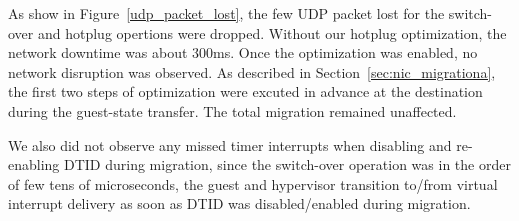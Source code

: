 As show in Figure~\ref{udp_packet_lost}, the few UDP packet
lost for the switch-over and hotplug opertions were dropped.
Without our hotplug optimization, the network downtime was
about 300ms. Once the optimization was enabled, no network
disruption was observed. As described in
Section~\ref{sec:nic_migrationa}, the first two steps of
optimization were excuted in advance at the destination during
the guest-state transfer. The total migration remained
unaffected.

We also did not observe any missed timer interrupts when
disabling and re-enabling DTID during migration, since the
switch-over operation was in the order of few tens of
microseconds, the guest and hypervisor transition to/from
virtual interrupt delivery as soon as DTID was
disabled/enabled during migration.






